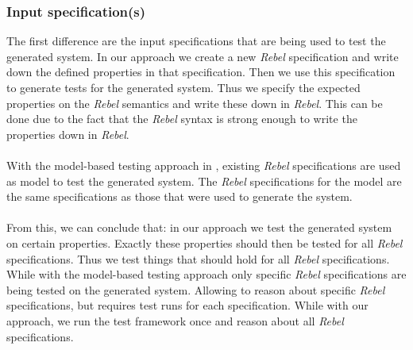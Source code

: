 \subsubsection{Input specification(s)}
The first difference are the input specifications that are being used to test the generated system. In our approach we create a new \textit{Rebel} specification and write down the defined properties in that specification. Then we use this specification to generate tests for the generated system. Thus we specify the expected properties on the \textit{Rebel} semantics and write these down in \textit{Rebel}. This can be done due to the fact that the \textit{Rebel} syntax is strong enough to write the properties down in \textit{Rebel}.\\
\\
With the model-based testing approach in , existing \textit{Rebel} specifications are used as model to test the generated system. The \textit{Rebel} specifications for the model are the same specifications as those that were used to generate the system.\\
\\
From this, we can conclude that: in our approach we test the generated system on certain properties. Exactly these properties should then be tested for all \textit{Rebel} specifications. Thus we test things that should hold for all \textit{Rebel} specifications. While with the model-based testing approach only specific \textit{Rebel} specifications are being tested on the generated system. Allowing to reason about specific \textit{Rebel} specifications, but requires test runs for each specification. While with our approach, we run the test framework once and reason about all \textit{Rebel} specifications.

